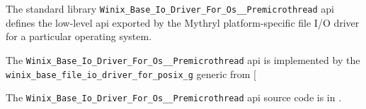 
The standard library {\tt Winix\_Base\_Io\_Driver\_For\_Os\_\_Premicrothread} api defines the low-level api exported by the 
Mythryl platform-specific file I/O driver for a particular operating system.

The {\tt Winix\_Base\_Io\_Driver\_For\_Os\_\_Premicrothread} api is implemented by the {\tt winix\_base\_file\_io\_driver\_for\_posix\_g} generic from 
[

The {\tt Winix\_Base\_Io\_Driver\_For\_Os\_\_Premicrothread} api source code is in .





